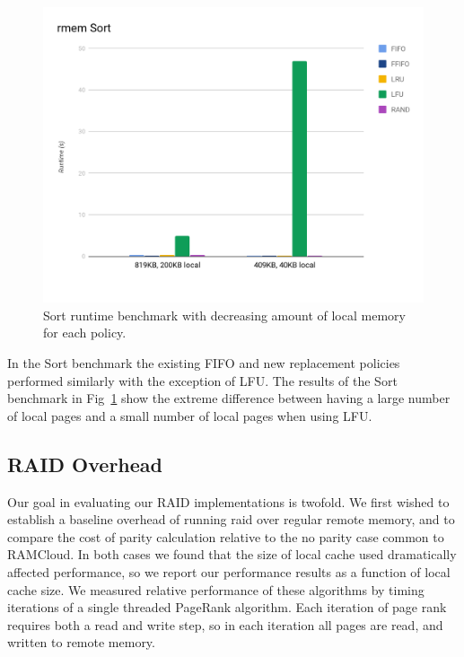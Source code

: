 \begin{figure}[H]
    \includegraphics[width=\columnwidth]{fig/sortPerformance}
    \caption{Sort runtime benchmark with decreasing amount of local memory for each policy.}
    \label{fig:sortPerformance}
\end{figure}

In the Sort benchmark the existing FIFO and new replacement policies performed similarly with the exception of LFU. The results of the Sort benchmark in Fig~\ref{fig:sortPerformance} show the extreme difference between having a large number of local pages and a small number of local pages when using LFU.

\subsection{RAID Overhead}

Our goal in evaluating our RAID implementations is twofold. We first
wished to establish a baseline overhead of running raid over regular
remote memory, and to compare the cost of parity calculation relative
to the no parity case common to RAMCloud. In both cases we found that
the size of local cache used dramatically affected performance, so we
report our performance results as a function of local cache size. We
measured relative performance of these algorithms by timing
iterations of a single threaded PageRank algorithm. Each iteration
of page rank requires both a read and write step, so in each
iteration all pages are read, and written to remote memory.

